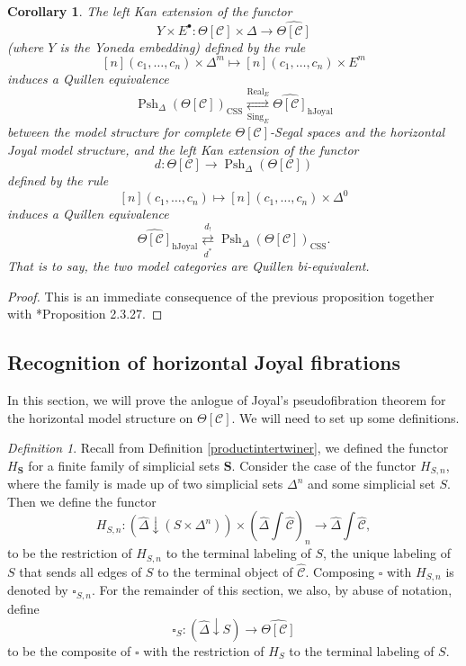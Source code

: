\documentclass[leqno]{article}
\numberwithin{equation}{subsection}
\theoremstyle{plain}   %
\newtheorem{cor}[equation]{Corollary}
\theoremstyle{remark}
\newtheorem{defn}[equation]{Definition}
\theoremstyle{plain}
\DeclareMathOperator{\Psh}{Psh}
\newcommand{\overcat}[2]{{\left(#1\downarrow #2\right)}}
\newcommand{\psh}[1]{\ensuremath{\widehat{#1}}}
\providecommand{\C}{}
\renewcommand{\C}{\ensuremath{\mathcal{C}}}
\newcommand{\cellset}{\ensuremath{\widehat{\Theta[\mathcal{C}]}}}
\newcommand{\ssetlab}{\ensuremath{\widehat{\Delta} \int \widehat{\mathcal{C}}}}
\begin{document}
\begin{cor}
	The left Kan extension of the functor \[Y \times E^\bullet:\Theta[\C]\times \Delta \to \cellset\] (where \(Y\) is the Yoneda embedding) defined by the rule 
	\[[n](c_1,\dots,c_n)\times \Delta^m \mapsto [n](c_1,\dots,c_n) \times E^m\]
	induces a Quillen equivalence
	\[\Psh_\Delta(\Theta[\C])_{\mathrm{CSS}} \underset{\operatorname{Sing}_E}{\overset{\operatorname{Real}_E}{\rightleftarrows}} \cellset_{\mathrm{hJoyal}}\]
	between the model structure for complete \(\Theta[\C]\)-Segal spaces and the horizontal Joyal model structure,
	and the left Kan extension of the functor 
	\[d:\Theta[\C] \to \Psh_\Delta(\Theta[\C])\]
	defined by the rule
	\[[n](c_1,\dots,c_n) \mapsto [n](c_1,\dots,c_n) \times \Delta^0\]
	induces a Quillen equivalence
	\[\cellset_{\mathrm{hJoyal}} \underset{d^\ast}{\overset{d_!}{\rightleftarrows}} \Psh_\Delta(\Theta[\C])_{\mathrm{CSS}}.\]
	That is to say, the two model categories are Quillen bi-equivalent.
\end{cor}
\begin{proof} This is an immediate consequence of the previous proposition together with \cite{cisinski-book}*{Proposition 2.3.27}.
\end{proof}

\subsection{Recognition of horizontal Joyal fibrations}\label{admissible}
In this section, we will prove the anlogue of Joyal's pseudofibration theorem for the horizontal model structure on \(\Theta[\C]\).  We will need to set up some definitions.

\begin{defn}
	Recall from Definition \ref{productintertwiner}, we defined the functor \(H_\mathbf{S}\) for a finite family of simplicial sets \(\mathbf{S}\).  Consider the case of the functor \(H_{S,n}\), where the family is made up of two simplicial sets \(\Delta^n\) and some simplicial set \(S\).  Then we define the functor 
	\[H_{S,n}: \overcat{\psh{\Delta}}{(S\times \Delta^n)} \times  \left(\ssetlab\right)_{n} \to \ssetlab,\]
	to be the restriction of \(H_{S,n}\) to the terminal labeling of \(S\), the unique labeling of \(S\) that sends all edges of \(S\) to the terminal object of \(\psh{\C}\).   Composing \(\square\) with \(H_{S,n}\) is denoted by \(\square_{S,n}\).  For the remainder of this section, we also, by abuse of notation, define 
	\[\square_S:\overcat{\psh{\Delta}}{S} \to \cellset\]
	to be the composite of \(\square\) with the restriction of \(H_S\) to the terminal labeling of \(S\).  
\end{defn}
\end{document}
